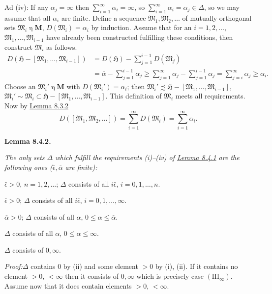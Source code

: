 \documentclass[12pt,b5paper,twoside]{article}
\newcommand{\Hspace}{\mathfrak H}
\newcommand{\M}{\mathbf M}
\newcommand{\Lemma}[1]{%
  \par\smallskip\noindent\phantomsection\label{lem:#1}\textbf{Lemma #1.}\enspace
}
\newcommand{\Proof}{\par\noindent\textit{Proof:}\enspace}
\newcommand{\lemref}[1]{\hyperref[lem:#1]{Lemma #1}}
\begin{document}
Ad (iv): If any $\alpha_j=\infty$ then
$\sum_{i=1}^{\infty}\alpha_i=\infty$, so
$\sum_{i=1}^{\infty}\alpha_i=\alpha_j\in\Delta$, so we may assume that all
$\alpha_i$ are finite. Define a sequence $\mathfrak M_1,\mathfrak M_2,\ldots$
of mutually orthogonal sets $\mathfrak M_i\mathbin\eta\M$,
$D(\mathfrak M_i)=\alpha_i$ by induction. Assume that for an
$i=1,2,\ldots$, $\mathfrak M_1,\ldots,\mathfrak M_{i-1}$ have already been
constructed fulfilling these conditions, then construct $\mathfrak M_i$ as
follows.
\begin{align*}
 D(\Hspace-[\mathfrak M_1,\ldots,\mathfrak M_{i-1}])
 &=D(\Hspace)-\sum_{j=1}^{i-1}D(\mathfrak M_j)\\
 &=\overline\alpha-\sum_{j=1}^{i-1}\alpha_j
 \geq\sum_{j=1}^{\infty}\alpha_j-\sum_{j=1}^{i-1}\alpha_j
 =\sum_{j=i}^{\infty}\alpha_j\geq\alpha_i.
\end{align*}
Choose an $\mathfrak M_i'\mathbin\eta\M$ with
$D(\mathfrak M_i')=\alpha_i$; then
$\mathfrak M_i'\precsim\Hspace-[\mathfrak M_1,\ldots,\mathfrak M_{i-1}]$,
$\mathfrak M_i'\sim\mathfrak M_i\subset
\Hspace-[\mathfrak M_1,\ldots,\mathfrak M_{i-1}]$. This definition of
$\mathfrak M_i$ meets all requirements. Now by \lemref{8.3.2}
\[
 D([\mathfrak M_1,\mathfrak M_2,\ldots])
 =\sum_{i=1}^{\infty}D(\mathfrak M_i)
 =\sum_{i=1}^{\infty}\alpha_i.
\]

\Lemma{8.4.2}
{\itshape
The only sets $\Delta$ which fulfill the requirements (i)--(iv) of
\lemref{8.4.1} are the following ones ($\bar\epsilon,\overline\alpha$ are finite):
\begin{description}[style=multiline,leftmargin=4.4em]
\item[$(\mathrm I_n)$] $\bar\epsilon>0$, $n=1,2,\ldots$;
  $\Delta$ consists of all $i\bar\epsilon$, $i=0,1,\ldots,n$.
\item[$(\mathrm I_\infty)$] $\bar\epsilon>0$;
  $\Delta$ consists of all $i\bar\epsilon$, $i=0,1,\ldots,\infty$.
\item[$(\mathrm{II}_1)$] $\overline\alpha>0$;
  $\Delta$ consists of all $\alpha$, $0\leq\alpha\leq\overline\alpha$.
\item[$(\mathrm{II}_\infty)$] $\Delta$ consists of all $\alpha$,
  $0\leq\alpha\leq\infty$.
\item[$(\mathrm{III}_\infty)$] $\Delta$ consists of $0,\infty$.
\end{description}}

\Proof $\Delta$ contains $0$ by (ii) and some element $>0$ by (i), (ii). If it
contains no element $>0$, $<\infty$ then it consists of $0,\infty$ which is
precisely case $(\mathrm{III}_\infty)$. Assume now that it does contain
elements $>0$, $<\infty$.
\end{document}
